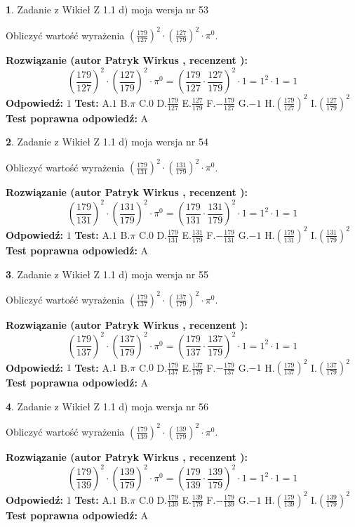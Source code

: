 \documentclass[12pt, a4paper]{article}
\theoremstyle{definition} %
\newtheorem{zad}{}
\newcommand{\zadStart}[1]{\begin{zad}#1\newline}
\newcommand{\zadStop}{\end{zad}}
\newcommand{\rozwStart}[2]{\noindent \textbf{Rozwiązanie (autor #1 , recenzent #2): }\newline}
\newcommand{\rozwStop}{\newline}
\newcommand{\odpStart}{\noindent \textbf{Odpowiedź:}\newline}
\newcommand{\odpStop}{\newline}
\newcommand{\testStart}{\noindent \textbf{Test:}\newline}
\newcommand{\testStop}{\newline}
\newcommand{\kluczStart}{\noindent \textbf{Test poprawna odpowiedź:}\newline}
\newcommand{\kluczStop}{\newline}
\begin{document}
\zadStart{Zadanie z Wikieł Z 1.1 d) moja wersja nr 53}

Obliczyć wartość wyrażenia $(\frac{179}{127})^{2} \cdot (\frac{127}{179})^{2} \cdot \pi^{0}$.
\zadStop
\rozwStart{Patryk Wirkus}{}
$$(\frac{179}{127})^{2} \cdot (\frac{127}{179})^{2} \cdot \pi^{0} = (\frac{179}{127} \cdot \frac{127}{179})^{2} \cdot 1 = 1^{2} \cdot 1 = 1$$
\rozwStop
\odpStart
$1$
\odpStop
\testStart
A.$1$ B.$\pi$ C.$0$ D.$\frac{179}{127}$ E.$\frac{127}{179}$
F.$-\frac{179}{127}$ G.$-1$
H.$(\frac{179}{127})^{2}$
I.$(\frac{127}{179})^{2}$
\testStop
\kluczStart
A
\kluczStop



\zadStart{Zadanie z Wikieł Z 1.1 d) moja wersja nr 54}

Obliczyć wartość wyrażenia $(\frac{179}{131})^{2} \cdot (\frac{131}{179})^{2} \cdot \pi^{0}$.
\zadStop
\rozwStart{Patryk Wirkus}{}
$$(\frac{179}{131})^{2} \cdot (\frac{131}{179})^{2} \cdot \pi^{0} = (\frac{179}{131} \cdot \frac{131}{179})^{2} \cdot 1 = 1^{2} \cdot 1 = 1$$
\rozwStop
\odpStart
$1$
\odpStop
\testStart
A.$1$ B.$\pi$ C.$0$ D.$\frac{179}{131}$ E.$\frac{131}{179}$
F.$-\frac{179}{131}$ G.$-1$
H.$(\frac{179}{131})^{2}$
I.$(\frac{131}{179})^{2}$
\testStop
\kluczStart
A
\kluczStop



\zadStart{Zadanie z Wikieł Z 1.1 d) moja wersja nr 55}

Obliczyć wartość wyrażenia $(\frac{179}{137})^{2} \cdot (\frac{137}{179})^{2} \cdot \pi^{0}$.
\zadStop
\rozwStart{Patryk Wirkus}{}
$$(\frac{179}{137})^{2} \cdot (\frac{137}{179})^{2} \cdot \pi^{0} = (\frac{179}{137} \cdot \frac{137}{179})^{2} \cdot 1 = 1^{2} \cdot 1 = 1$$
\rozwStop
\odpStart
$1$
\odpStop
\testStart
A.$1$ B.$\pi$ C.$0$ D.$\frac{179}{137}$ E.$\frac{137}{179}$
F.$-\frac{179}{137}$ G.$-1$
H.$(\frac{179}{137})^{2}$
I.$(\frac{137}{179})^{2}$
\testStop
\kluczStart
A
\kluczStop



\zadStart{Zadanie z Wikieł Z 1.1 d) moja wersja nr 56}

Obliczyć wartość wyrażenia $(\frac{179}{139})^{2} \cdot (\frac{139}{179})^{2} \cdot \pi^{0}$.
\zadStop
\rozwStart{Patryk Wirkus}{}
$$(\frac{179}{139})^{2} \cdot (\frac{139}{179})^{2} \cdot \pi^{0} = (\frac{179}{139} \cdot \frac{139}{179})^{2} \cdot 1 = 1^{2} \cdot 1 = 1$$
\rozwStop
\odpStart
$1$
\odpStop
\testStart
A.$1$ B.$\pi$ C.$0$ D.$\frac{179}{139}$ E.$\frac{139}{179}$
F.$-\frac{179}{139}$ G.$-1$
H.$(\frac{179}{139})^{2}$
I.$(\frac{139}{179})^{2}$
\testStop
\kluczStart
A
\kluczStop
\end{document}
